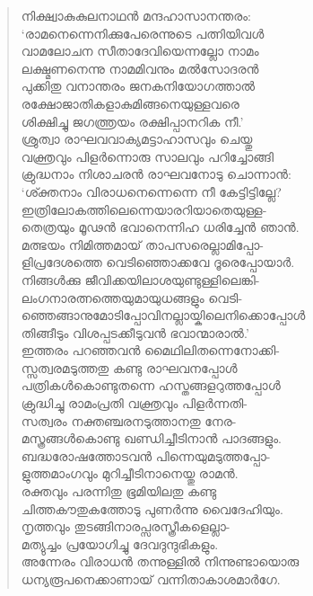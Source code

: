 \begin{verse}
നിക്ഷ്വാകുകുലനാഥന്‍ മന്ദഹാസാനന്തരം:\\
‘രാമനെന്നെനിക്കുപേരെന്നുടെ പത്നിയിവള്‍\\
വാമലോചന സീതാദേവിയെന്നല്ലോ നാമം\\
ലക്ഷ്മണനെന്നു നാമമിവനും മല്‍സോദരന്‍\\
പുക്കിതു വനാന്തരം ജനകനിയോഗത്താല്‍\\
രക്ഷോജാതികളാകുമിങ്ങനെയുള്ളവരെ\\
ശിക്ഷിച്ചു ജഗത്ത്രയം രക്ഷിപ്പാനറിക നീ.’\\
ശ്രുത്വാ രാഘവവാക്യമട്ടാഹാസവും ചെയ്തു\\
വക്ത്രവും പിളര്‍ന്നൊരു സാലവും പറിച്ചോങ്ങി\\
ക്രുദ്ധനാം നിശാചരന്‍ രാഘവനോടു ചൊന്നാന്‍:\\
‘ശ്ക്തനാം വിരാധനെന്നെന്നെ നീ കേട്ടിട്ടില്ലേ?\\
ഇത്രിലോകത്തിലെന്നെയാരറിയാതെയുള്ള-\\
തെത്രയും മൂഢന്‍ ഭവാനെന്നിഹ ധരിച്ചേന്‍ ഞാന്‍.\\
മത്ഭയം നിമിത്തമായ് താപസരെല്ലാമിപ്പോ-\\
ളിപ്രദേശത്തെ വെടിഞ്ഞൊക്കവേ ദൂരെപ്പോയാര്‍.\\
നിങ്ങള്‍ക്കു ജീവിക്കയിലാശയുണ്ടുള്ളിലെങ്കി-\\
ലംഗനാരത്നത്തെയുമായുധങ്ങളും വെടി-\\
ഞ്ഞെങ്ങാനുമോടിപ്പോവിനല്ലായ്കിലെനിക്കൊപ്പോള്‍\\
തിങ്ങീടും വിശപ്പടക്കീടുവന്‍ ഭവാന്മാരാല്‍.’\\
ഇത്തരം പറഞ്ഞവന്‍ മൈഥിലിതന്നെനോക്കി-\\
സ്സത്വരമടുത്തതു കണ്ടു രാഘവനപ്പോള്‍\\
പത്രികള്‍കൊണ്ടുതന്നെ ഹസ്തങ്ങളറുത്തപ്പോള്‍\\
ക്രുദ്ധിച്ചു രാമംപ്രതി വക്ത്രവും പിളര്‍ന്നതി-\\
സത്വരം നക്തഞ്ചരനടുത്താനതു നേര-\\
മസ്ത്രങ്ങള്‍കൊണ്ടു ഖണ്ഡിച്ചീടിനാന്‍ പാദങ്ങളും.\\
ബദ്ധരോഷത്തോടവന്‍ പിന്നെയുമടുത്തപ്പോ-\\
ളുത്തമാംഗവും മുറിച്ചീടിനാനെയ്തു രാമന്‍.\\
രക്തവും പരന്നിതു ഭൂമിയിലതു കണ്ടു\\
ചിത്തകൗതുകത്തോടു പുണര്‍ന്നു വൈദേഹിയും.\\
നൃത്തവും തുടങ്ങിനാരപ്സരസ്ത്രീകളെല്ലാ-\\
മത്യുച്ചം പ്രയോഗിച്ചു ദേവദുന്ദുഭികളും.\\
അന്നേരം വിരാധന്‍ തന്നുള്ളില്‍ നിന്നുണ്ടായൊരു\\
ധന്യരൂപനെക്കാണായ് വന്നിതാകാശമാര്‍ഗേ.\\

\end{verse}
